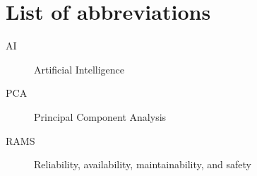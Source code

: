 \documentclass[../Main/thesis.tex]{subfiles}
\begin{document}
\chapter*{List of abbreviations}
\begin{description}
\item[AI] Artificial Intelligence
\item[PCA] Principal Component Analysis
\item[RAMS] Reliability, availability, maintainability, and safety
\end{description}

\blankpage
\end{document}
